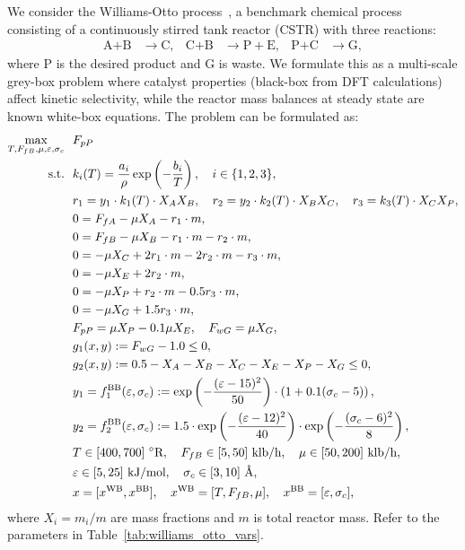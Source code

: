 \documentclass[12pt,a4paper]{article}%
\theoremstyle{plain}%
\theoremstyle{remark}%
\theoremstyle{definition}%
\def\WB{\mathrm{WB}}
\def\BB{\mathrm{BB}}
\begin{document}
\begin{appendices}
We consider the Williams-Otto process~\cite{williams1960,schmid2020}, a benchmark chemical process consisting of a continuously stirred tank reactor (CSTR) with three reactions:
\begin{align*}
    \text{A} + \text{B} &\to \text{C}, &
    \text{C} + \text{B} &\to \text{P} + \text{E}, &
    \text{P} + \text{C} &\to \text{G},
\end{align*}
where P is the desired product and G is waste. We formulate this as a multi-scale grey-box problem where catalyst properties (black-box from DFT calculations) affect kinetic selectivity, while the reactor mass balances at steady state are known white-box equations. The problem can be formulated as:
\begin{align} \label{eq:WilliamsOtto}
    \max_{T, F_{fB}, \mu, \varepsilon, \sigma_c} &~~ F_{pP} \\\notag
    \text{s.t.} &~~ k_i(T) = \frac{a_i}{\rho} \exp\left(-\frac{b_i}{T}\right), \quad i \in \{1, 2, 3\}, \\\notag
    &~~ r_1 = y_1 \cdot k_1(T) \cdot X_A X_B, \quad r_2 = y_2 \cdot k_2(T) \cdot X_B X_C, \quad r_3 = k_3(T) \cdot X_C X_P, \\\notag
    &~~ 0 = F_{fA} - \mu X_A - r_1 \cdot m, \\\notag
    &~~ 0 = F_{fB} - \mu X_B - r_1 \cdot m - r_2 \cdot m, \\\notag
    &~~ 0 = -\mu X_C + 2r_1 \cdot m - 2r_2 \cdot m - r_3 \cdot m, \\\notag
    &~~ 0 = -\mu X_E + 2r_2 \cdot m, \\\notag
    &~~ 0 = -\mu X_P + r_2 \cdot m - 0.5 r_3 \cdot m, \\\notag
    &~~ 0 = -\mu X_G + 1.5 r_3 \cdot m, \\\notag
    &~~ F_{pP} = \mu X_P - 0.1 \mu X_E, \quad F_{wG} = \mu X_G, \\\notag
    &~~ g_1(x, y) := F_{wG} - 1.0 \leq 0, \\\notag
    &~~ g_2(x, y) := 0.5 - X_A - X_B - X_C - X_E - X_P - X_G \leq 0, \\\notag
    &~~ y_1 = f^\BB_1(\varepsilon, \sigma_c) := \exp\left(-\frac{(\varepsilon - 15)^2}{50}\right) \cdot \left(1 + 0.1(\sigma_c - 5)\right), \\\notag
    &~~ y_2 = f^\BB_2(\varepsilon, \sigma_c) := 1.5 \cdot \exp\left(-\frac{(\varepsilon - 12)^2}{40}\right) \cdot \exp\left(-\frac{(\sigma_c - 6)^2}{8}\right), \\\notag
    &~~ T \in [400, 700]~^\circ\text{R}, \quad F_{fB} \in [5, 50]~\text{klb/h}, \quad \mu \in [50, 200]~\text{klb/h}, \\\notag
    &~~ \varepsilon \in [5, 25]~\text{kJ/mol}, \quad \sigma_c \in [3, 10]~\text{\AA}, \\\notag
    &~~ x = [x^{\WB}, x^{\BB}], \quad x^{\WB} = [T, F_{fB}, \mu], \quad x^{\BB} = [\varepsilon, \sigma_c],
\end{align}
where $X_i = m_i/m$ are mass fractions and $m$ is total reactor mass. Refer to the parameters in Table~\ref{tab:williams_otto_vars}.


\end{appendices}
\end{document}

